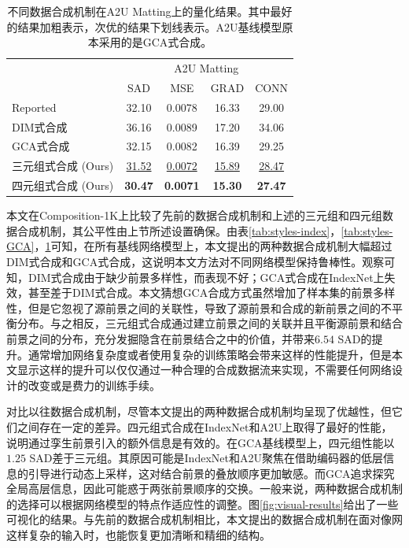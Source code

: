 \documentclass[supercite]{HustGraduPaper}
\begin{document}
	\begin{table}[htbp]
		\setlength{\tabcolsep}{7.2pt}
		\vspace{10pt}
		\centering
		\caption{不同数据合成机制在A2U Matting上的量化结果。其中最好的结果加粗表示，次优的结果下划线表示。A2U基线模型原本采用的是GCA式合成。}
		\label{tab:styles-A2U}
		\begin{tabular}{@{}lcccc@{}}
		\toprule
		& \multicolumn{4}{c}{A2U Matting} \\
		& SAD    & MSE  & GRAD  & CONN\\
		\midrule
		Reported         & 32.10 & 0.0078 & 16.33  & 29.00     \\
		DIM式合成         & 36.16 & 0.0089 & 17.20  & 34.06    \\
		GCA式合成         & 32.15 & 0.0082 & 16.39 & 29.25 \\
		三元组式合成 (Ours)    &\underline{31.52} & \underline{0.0072} & \underline{15.89} & \underline{28.47} \\
		四元组式合成 (Ours) & \textbf{30.47} & \textbf{0.0071} & \textbf{15.30} & \textbf{27.47}\\
		\bottomrule
		\end{tabular}
	\end{table}
	本文在Composition-1K上比较了先前的数据合成机制和上述的三元组和四元组数据合成机制，其公平性由上节所述设置确保。由表\ref{tab:styles-index}，\ref{tab:styles-GCA}，\ref{tab:styles-A2U}可知，在所有基线网络模型上，本文提出的两种数据合成机制大幅超过DIM式合成和GCA式合成，这说明本文方法对不同网络模型保持鲁棒性。观察可知，DIM式合成由于缺少前景多样性，而表现不好；GCA式合成在IndexNet上失效，甚至差于DIM式合成。本文猜想GCA合成方式虽然增加了样本集的前景多样性，但是它忽视了源前景之间的关联性，导致了源前景和合成的新前景之间的不平衡分布。与之相反，三元组式合成通过建立前景之间的关联并且平衡源前景和结合前景之间的分布，充分发掘隐含在前景结合之中的价值，并带来$6.54$ SAD的提升。通常增加网络复杂度或者使用复杂的训练策略会带来这样的性能提升，但是本文显示这样的提升可以仅仅通过一种合理的合成数据流来实现，不需要任何网络设计的改变或是费力的训练手续。


	对比以往数据合成机制，尽管本文提出的两种数据合成机制均呈现了优越性，但它们之间存在一定的差异。四元组式合成在IndexNet和A2U上取得了最好的性能，说明通过孪生前景引入的额外信息是有效的。在GCA基线模型上，四元组性能以$1.25$ SAD差于三元组。其原因可能是IndexNet和A2U聚焦在借助编码器的低层信息的引导进行动态上采样，这对结合前景的叠放顺序更加敏感。而GCA追求探究全局高层信息，因此可能惑于两张前景顺序的交换。一般来说，两种数据合成机制的选择可以根据网络模型的特点作适应性的调整。图\ref{fig:visual-results}给出了一些可视化的结果。与先前的数据合成机制相比，本文提出的数据合成机制在面对像网这样复杂的输入时，也能恢复更加清晰和精细的结构。
\end{document}
